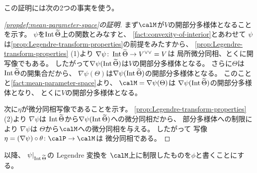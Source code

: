 \documentclass[report]{jlreq}
\begin{document}
この証明には次の2つの事実を使う。



\begin{proof}[\cref{propdef:mean-parameter-space}の証明]
    まず$\calM$が$V$の開部分多様体となることを示す。
    $\psi$を$\operatorname{Int} \widetilde{\Theta}$上の関数とみなすと、
    \cref{fact:convexity-of-interior}とあわせて
    $\psi$は\cref{prop:Legendre-transform-properties}の前提をみたすから、
    \cref{prop:Legendre-transform-properties} (1)より
    $\nabla \psi \colon \operatorname{Int} \widetilde{\Theta} \to V^{\vee\vee} = V$は
    局所微分同相、とくに開写像でもある。
    したがって$\nabla \psi(\operatorname{Int} \widetilde{\Theta})$は$V$の開部分多様体となる。
    さらに$\Theta$は$\operatorname{Int} \widetilde{\Theta}$の開集合だから、
    $\nabla \psi(\Theta)$は$\nabla \psi(\operatorname{Int} \widetilde{\Theta})$の開部分多様体となる。
    このことと\cref{fact:mean-parameter-space}より、
    $\calM = \nabla \psi(\Theta)$は
    $\nabla \psi(\operatorname{Int} \widetilde{\Theta})$の開部分多様体となり、
    とくに$V$の開部分多様体となる。

    次に$\eta$が微分同相写像であることを示す。
    \cref{prop:Legendre-transform-properties} (2)より
    $\nabla \psi$は
    $\operatorname{Int} \widetilde{\Theta}$から$\nabla \psi(\operatorname{Int} \widetilde{\Theta})$への微分同相だから、
    部分多様体への制限により
    $\nabla \psi$は
    $\Theta$から$\calM$への微分同相を与える。
    したがって
    写像$\eta = (\nabla \psi) \circ \theta \colon \calP \to \calM$は
    微分同相である。
\end{proof}

以降、
$\psi|_{\operatorname{Int} \widetilde{\Theta}}$の Legendre 変換を
$\calM$上に制限したものを$\phi$と書くことにする。
\end{document}
